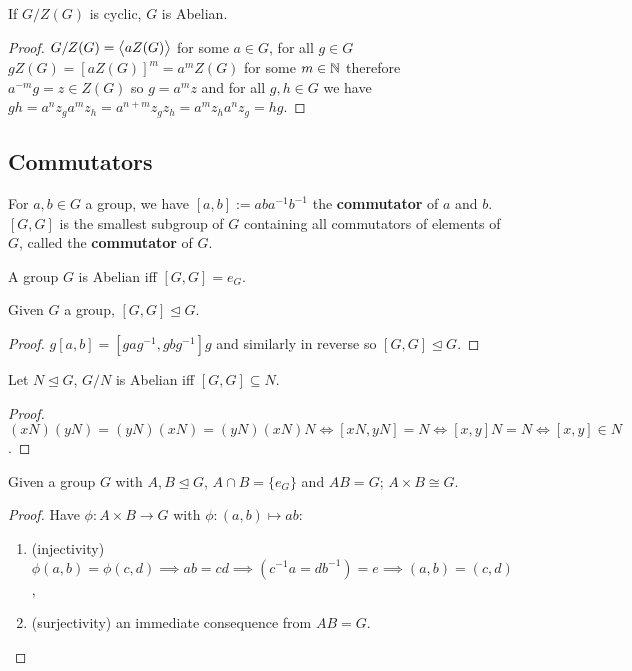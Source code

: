 \documentclass[../Year2.tex]{subfiles}
\begin{document}
\begin{proposition}
    If $G/Z(G)$ is cyclic, $G$ is Abelian.
    \begin{proof}
         $G/Z(G)=\left\langle aZ(G) \right\rangle$ for some $a\in G$, for all $g\in G$ $gZ(G)={[aZ(G)]}^m=a^m Z(G)$ for some $m\in\mathbb{N}$ therefore $a^{-m}g=z\in Z(G)$ so $g=a^m z$ and for all $g,h\in G$ we have $gh=a^n z_g a^m z_h = a^{n+m}z_g z_h = a^m z_h a^n z_g=hg$.
    \end{proof}
\end{proposition}

\subsection{Commutators}

\begin{definition}[Commutator]
    For $a,b\in G$ a group, we have $[a,b]:=aba^{-1}b^{-1}$ the \textbf{commutator} of $a$ and $b$. $[G,G]$ is the smallest subgroup of $G$ containing all commutators of elements of $G$, called the \textbf{commutator} of $G$.
\end{definition}

\begin{remark}
    A group $G$ is Abelian iff $[G,G]=e_G$.
\end{remark}

\begin{theorem}
    Given $G$ a group, $[G,G]\unlhd G$.
    \begin{proof}
        $g[a,b]=[gag^{-1},gbg^{-1}]g$ and similarly in reverse so $[G,G]\unlhd G$.
    \end{proof}
\end{theorem}

\begin{theorem}
    Let $N\unlhd G$, $G/N$ is Abelian iff $[G,G]\subseteq N$.
    \begin{proof}
        $(xN)(yN)=(yN)(xN)=(yN)(xN)N\iff [xN,yN]=N\iff[x,y]N=N\iff[x,y]\in N$.
    \end{proof}
\end{theorem}

\begin{theorem}
    Given a group $G$ with $A,B\unlhd G$, $A\cap B=\{e_G\}$ and $AB=G$; $A\times B\cong G$.
    \begin{proof}
        Have $\phi: A\times B \rightarrow G$ with $\phi:(a,b)\mapsto ab$:\begin{enumerate}
            \item[](injectivity) $\phi(a,b)=\phi(c,d)\implies ab=cd \implies (c^{-1}a=db^{-1})=e\implies (a,b)=(c,d)$,
            \item[](surjectivity) an immediate consequence from $AB=G$.
        \end{enumerate}
        \vspace{-19pt}
    \end{proof}
\end{theorem}
\end{document}
